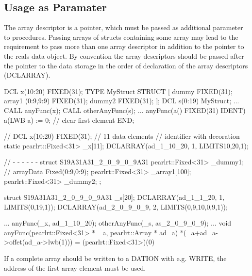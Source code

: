\subsection{Usage as Paramater}
The array descriptor is a pointer, which must be passed as additional parameter
to procedures. 
Passing arrays of structs containing some array may lead to the requirement
to pass more than one array descriptor in addition to the pointer to the 
reals data object.
By convention the array descriptors should be passed after the pointer to the
data storage in the order of declaration of the array descriptors (DCLARRAY).

\begin{PEARLCode}
DCL x(10:20) FIXED(31); 
TYPE MyStruct STRUCT [
           dummy FIXED(31);
           array1 (0:9,9:9) FIXED(31);
           dummy2 FIXED(31);
           ];
DCL s(0:19) MyStruct;
...
CALL anyFunc(x);
CALL otherAnyFunc(s);
...
anyFunc(a() FIXED(31) IDENT) 
   a(LWB a) := 0;  // clear first element
END;
\end{PEARLCode}

\begin{CppCode}
// DCL x(10:20) FIXED(31); 
 // 11 data elements
 // identifier with decoration
static pearlrt::Fixed<31> _x[11];
DCLARRAY(ad_1_10_20, 1, LIMITS{{10,20,1}});

// - - - - - - 
   struct S19A31A31_2_0_9_0_9A31 {
      pearlrt::Fixed<31> _dummy1;
                       // arrayData Fixed(0:9,0:9);
      pearlrt::Fixed<31> _array1[100]; 
      pearlrt::Fixed<31> _dummy2;
   };

   struct S19A31A31_2_0_9_0_9A31  _s[20]; 
   DCLARRAY(ad_1_1_20, 1, LIMITS({{0,19,1}}));
   DCLARRAY(ad_2_0_9_0_9, 2, LIMITS({{0,9,10},{0,9,1}}));

...
   anyFunc(_x, ad_1_10_20);
   otherAnyFunc(_s, as_2_0_9_0_9);
...
void anyFunc(pearlrt::Fixed<31> * _a,
             pearlrt::Array * ad_a) {
  *(_a+ad_a->offet(ad_a->lwb(1))) =
          (pearlrt::Fixed<31>)(0)
}
\end{CppCode}

If a complete array should be written to a DATION with e.g. WRITE,
the address of the first array element must be used.


